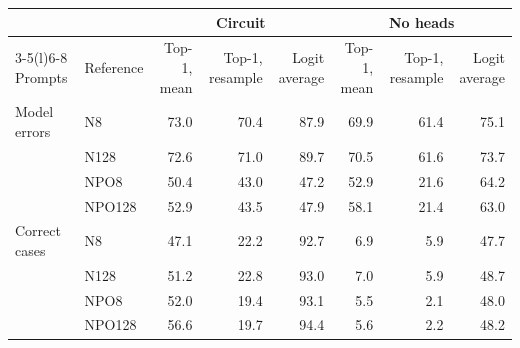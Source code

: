 \begin{tabular}{@{}llrrrrrr@{}}
\toprule
 & & \multicolumn{3}{c}{Circuit} & \multicolumn{3}{c}{No heads} \\
\cmidrule(lr){3-5}\cmidrule(l){6-8}
Prompts & Reference & Top-1, mean & Top-1, resample & Logit average & Top-1, mean & Top-1, resample & Logit average \\
\midrule
Model errors & N8 & 73.0 & 70.4 & 87.9 & 69.9 & 61.4 & 75.1 \\
 & N128 & 72.6 & 71.0 & 89.7 & 70.5 & 61.6 & 73.7 \\
 & NPO8 & 50.4 & 43.0 & 47.2 & 52.9 & 21.6 & 64.2 \\
 & NPO128 & 52.9 & 43.5 & 47.9 & 58.1 & 21.4 & 63.0 \\
\midrule
Correct cases & N8 & 47.1 & 22.2 & 92.7 & 6.9 & 5.9 & 47.7 \\
 & N128 & 51.2 & 22.8 & 93.0 & 7.0 & 5.9 & 48.7 \\
 & NPO8 & 52.0 & 19.4 & 93.1 & 5.5 & 2.1 & 48.0 \\
 & NPO128 & 56.6 & 19.7 & 94.4 & 5.6 & 2.2 & 48.2 \\
\bottomrule
\end{tabular}

